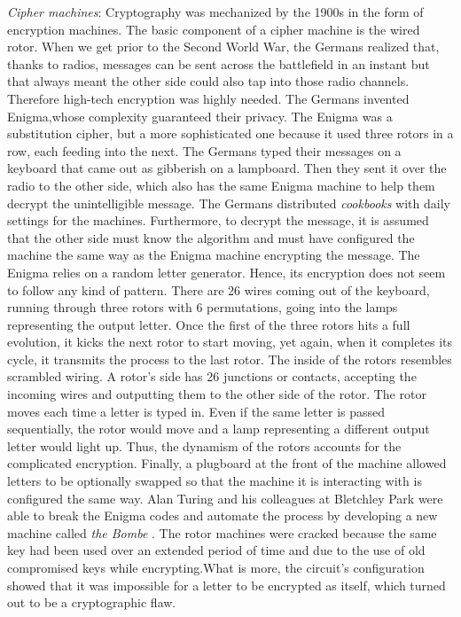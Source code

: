 \textit{Cipher machines}: Cryptography was mechanized by the 1900s in the form of encryption machines. The basic component of a cipher machine is the wired rotor.
When we get prior to the Second World War, the Germans realized that, thanks to radios, messages can be sent across the battlefield in an instant but that always meant the other side could also tap into those radio channels. Therefore high-tech encryption was highly needed. The Germans invented Enigma,whose complexity guaranteed their privacy. The Enigma was a substitution cipher, but a more sophisticated one because it used three rotors in a row, each feeding into the next. The Germans typed their messages on a keyboard that came out as gibberish on a lampboard. Then they sent it over the radio to the other side, which also has the same Enigma machine to help them decrypt the unintelligible message. The Germans distributed \textit{cookbooks} with daily settings for the machines. Furthermore, to decrypt the message, it is assumed that the other side must know the algorithm and must have configured the machine the same way as the Enigma machine encrypting the message. The Enigma relies on a random letter generator. Hence, its encryption does not seem to follow any kind of pattern. There are 26 wires coming out of the keyboard, running through three rotors with 6 permutations, going into the lamps representing the output letter. Once the first of the three rotors hits a full evolution, it kicks the next rotor to start moving, yet again, when it completes its cycle, it transmits the process to the last rotor. The inside of the rotors resembles scrambled wiring. A rotor's side has 26 junctions or contacts,  accepting the incoming wires and outputting them to the other side of the rotor. The rotor moves each time a letter is typed in. Even if the same letter is passed sequentially, the rotor would move and a lamp representing a different output letter would light up. Thus, the dynamism of the rotors accounts for the complicated encryption. Finally, a plugboard at the front of the machine allowed letters to be optionally swapped so that the machine it is interacting with is configured the same way. Alan Turing and his colleagues at Bletchley Park were able to break the Enigma codes and automate the process by developing a new machine called \textit{the Bombe} \cite{alanturing}. The rotor machines were cracked because the same key had been used over an extended period of time and due to the use of old compromised keys while encrypting.What is more, the circuit’s configuration showed that it was impossible for a letter to be encrypted as itself, which turned out to be a cryptographic flaw. 

